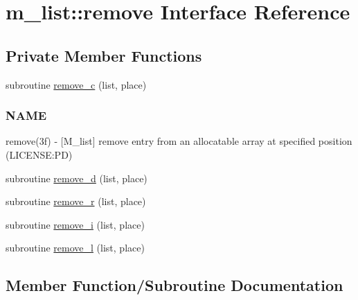 \hypertarget{interfacem__list_1_1remove}{}\section{m\+\_\+list\+:\+:remove Interface Reference}
\label{interfacem__list_1_1remove}
\subsection*{Private Member Functions}
\begin{DoxyCompactItemize}
\item 
subroutine \mbox{\hyperlink{interfacem__list_1_1remove_ae5113f879bd6fb1200ccd5ce6a588aa5}{remove\+\_\+c}} (list, place)
\begin{DoxyCompactList}\small\item\em \subsubsection*{N\+A\+ME}

remove(3f) -\/ \mbox{[}M\+\_\+list\mbox{]} remove entry from an allocatable array at specified position (L\+I\+C\+E\+N\+SE\+:PD) \end{DoxyCompactList}\item 
subroutine \mbox{\hyperlink{interfacem__list_1_1remove_ad82ff90a5f60f1ffb4eb9b29653886da}{remove\+\_\+d}} (list, place)
\item 
subroutine \mbox{\hyperlink{interfacem__list_1_1remove_ab1ff763ace170a3e1cd6df7a42bbe729}{remove\+\_\+r}} (list, place)
\item 
subroutine \mbox{\hyperlink{interfacem__list_1_1remove_a7a269ce865e3e5fec02a9a2a49f3c832}{remove\+\_\+i}} (list, place)
\item 
subroutine \mbox{\hyperlink{interfacem__list_1_1remove_ab2eefaeadd492f0256efaf3a27ba3126}{remove\+\_\+l}} (list, place)
\end{DoxyCompactItemize}


\subsection{Member Function/\+Subroutine Documentation}
\mbox{\label{interfacem__list_1_1remove_ae5113f879bd6fb1200ccd5ce6a588aa5}} 
